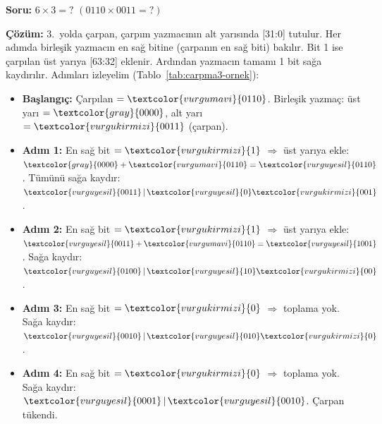 \FloatBarrier
\begin{ornek}[5.6]
\textbf{Soru:} $6 \times 3 = ?$ \quad $(0110 \times 0011 = ?)$

\textbf{Çözüm:} 3.\ yolda çarpan, çarpım yazmacının alt yarısında [31:0] tutulur. Her adımda birleşik yazmacın en sağ bitine (çarpanın en sağ biti) bakılır. Bit 1 ise çarpılan üst yarıya [63:32] eklenir. Ardından yazmacın tamamı 1 bit sağa kaydırılır. Adımları izleyelim (Tablo~\ref{tab:carpma3-ornek}):

\begin{itemize}[nosep]
\item \textbf{Başlangıç:} Çarpılan $= \textcolor{vurgumavi}{0110}$. Birleşik yazmaç: üst yarı $= \textcolor{gray}{0000}$, alt yarı $= \textcolor{vurgukirmizi}{0011}$ (çarpan).
\item \textbf{Adım 1:} En sağ bit $= \textcolor{vurgukirmizi}{1}$ $\Rightarrow$ üst yarıya ekle: $\textcolor{gray}{0000} + \textcolor{vurgumavi}{0110} = \textcolor{vurguyesil}{0110}$. Tümünü sağa kaydır: $\textcolor{vurguyesil}{0011}\,|\,\textcolor{vurguyesil}{0}\textcolor{vurgukirmizi}{001}$.
\item \textbf{Adım 2:} En sağ bit $= \textcolor{vurgukirmizi}{1}$ $\Rightarrow$ üst yarıya ekle: $\textcolor{vurguyesil}{0011} + \textcolor{vurgumavi}{0110} = \textcolor{vurguyesil}{1001}$. Sağa kaydır: $\textcolor{vurguyesil}{0100}\,|\,\textcolor{vurguyesil}{10}\textcolor{vurgukirmizi}{00}$.
\item \textbf{Adım 3:} En sağ bit $= \textcolor{vurgukirmizi}{0}$ $\Rightarrow$ toplama yok. Sağa kaydır: $\textcolor{vurguyesil}{0010}\,|\,\textcolor{vurguyesil}{010}\textcolor{vurgukirmizi}{0}$.
\item \textbf{Adım 4:} En sağ bit $= \textcolor{vurgukirmizi}{0}$ $\Rightarrow$ toplama yok. Sağa kaydır: $\textcolor{vurguyesil}{0001}\,|\,\textcolor{vurguyesil}{0010}$. Çarpan tükendi.
\end{itemize}


\end{ornek}
